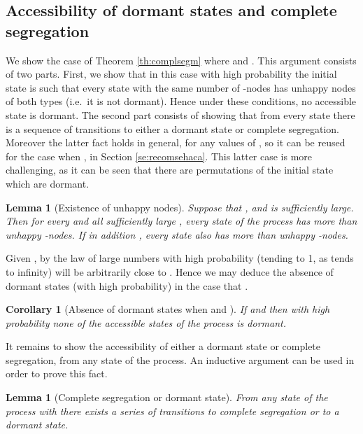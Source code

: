 \documentclass[11pt]{article}
\theoremstyle{plain}
\newtheorem{lem}[thm]{Lemma}
\newtheorem{coro}[thm]{Corollary}
\numberwithin{equation}{subsection}
\begin{document}
\subsection{Accessibility of dormant states and complete segregation}\label{subse:accdorcose}
We show  the case of Theorem \ref{th:complsegm} where  and
. This argument consists of two parts. First, we show that in this case
with high probability the initial state is such that
every state with the same number of -nodes has unhappy nodes of both types (i.e.\ it is not dormant).
Hence under these conditions, no accessible state is dormant.
The second part consists of showing that from every state there is a sequence of transitions to either a dormant state 
or complete segregation. Moreover the latter fact holds in general, for any values of , so it can be reused for the case when
, in Section \ref{se:recomsehaca}. This latter case is more challenging, 
as it can be seen that there are permutations of the initial state which are dormant.
\begin{lem}[Existence of unhappy nodes]\label{coro:exiunhangen}
Suppose that ,   and  is sufficiently large.
Then for every  and
all sufficiently large , every state of the process
 has more than  unhappy -nodes.
If in addition , every state also has 
more than  unhappy -nodes.
\end{lem}

Given , by the law of large numbers with high probability 
(tending to 1, as  tends to infinity)
 will be arbitrarily close to . 
Hence we may deduce the absence of dormant states
(with high probability) in the case that .
\begin{coro}[Absence of dormant states when  and ]\label{coro:absdormst.g}
If  and   then
with high probability none of the accessible states of
the process 
is dormant.
\end{coro}

It remains to show the accessibility of either a dormant state or
complete segregation, from any state of the process.
An inductive argument can be used in order to prove this fact.


\begin{lem}[Complete segregation or dormant state]\label{coro:inevcompsegd}
From any state of the process  with 
there exists a series of transitions to complete segregation or to a dormant state.
\end{lem}
\end{document}
